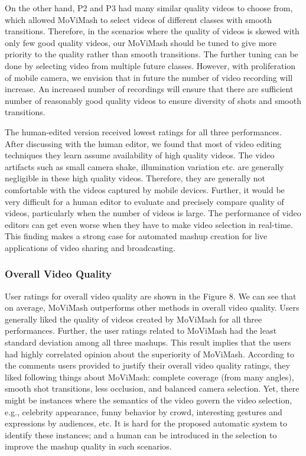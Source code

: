 \documentclass{sig-alternate}
\begin{document}
On the other hand, P2 and P3 had many similar quality videos
to choose from, which allowed MoViMash to select videos of different classes with smooth transitions. Therefore, in the scenarios where the quality of videos is skewed with only few good quality videos, our MoViMash should be tuned to give more priority to the quality rather than smooth transitions. The further tuning can be done by selecting video from multiple future classes. However, with proliferation of mobile camera, we envision that in future the number of video recording will increase. An increased number of recordings will ensure that there are sufficient number of reasonably good quality videos to ensure diversity of shots and smooth transitions.

The human-edited version received lowest ratings for all three
performances. After discussing with the human editor, we found
that most of video editing techniques they learn assume availability of high quality videos. The video artifacts such as small camera shake, illumination variation etc. are generally negligible in these high quality videos. Therefore, they are generally not comfortable with the videos captured by mobile devices. Further, it would be very difficult for a human editor to evaluate and precisely compare quality of videos, particularly when the number of videos is large. The performance of video editors can get even worse when they have to make video selection in real-time. This finding makes a strong case for automated mashup creation for live applications of video sharing and broadcasting.

\subsubsection{Overall Video Quality}
User ratings for overall video quality are shown in the Figure 8.
We can see that on average, MoViMash outperforms other methods
in overall video quality. Users generally liked the quality of
videos created by MoViMash for all three performances. Further,
the user ratings related to MoViMash had the least standard deviation among all three mashups. This result implies that the users had highly correlated opinion about the superiority of MoViMash. According to the comments users provided to justify their overall video quality ratings, they liked following things about MoViMash: complete coverage (from many angles), smooth shot transitions, less occlusion, and balanced camera selection. Yet, there might be instances where the semantics of the video govern the video selection, e.g., celebrity appearance, funny behavior by crowd, interesting gestures and expressions by audiences, etc. It is hard for the proposed automatic system to identify these instances; and a human can be introduced in the selection to improve the mashup quality in such scenarios.
\end{document}
